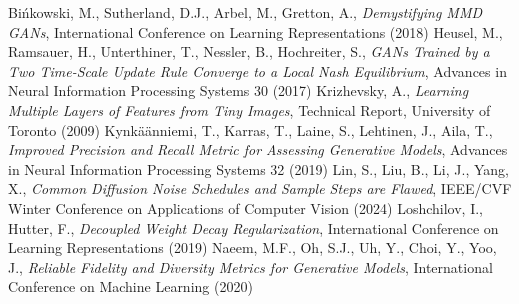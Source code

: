  Bi\'nkowski, M., Sutherland, D.J., Arbel, M., Gretton, A., \textit{Demystifying MMD GANs}, International Conference on Learning Representations (2018)
 Heusel, M., Ramsauer, H., Unterthiner, T., Nessler, B., Hochreiter, S., \textit{GANs Trained by a Two Time-Scale Update Rule Converge to a Local Nash Equilibrium}, Advances in Neural Information Processing Systems 30 (2017)
 Krizhevsky, A., \textit{Learning Multiple Layers of Features from Tiny Images}, Technical Report, University of Toronto (2009)
 Kynk\"a\"anniemi, T., Karras, T., Laine, S., Lehtinen, J., Aila, T., \textit{Improved Precision and Recall Metric for Assessing Generative Models}, Advances in Neural Information Processing Systems 32 (2019)
 Lin, S., Liu, B., Li, J., Yang, X., \textit{Common Diffusion Noise Schedules and Sample Steps are Flawed}, IEEE/CVF Winter Conference on Applications of Computer Vision (2024)
 Loshchilov, I., Hutter, F., \textit{Decoupled Weight Decay Regularization}, International Conference on Learning Representations (2019)
 Naeem, M.F., Oh, S.J., Uh, Y., Choi, Y., Yoo, J., \textit{Reliable Fidelity and Diversity Metrics for Generative Models}, International Conference on Machine Learning (2020)
